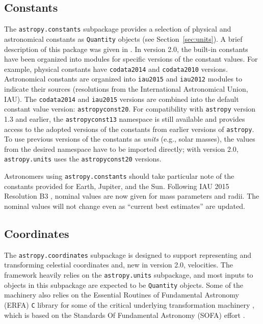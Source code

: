 \documentclass[modern]{aastex61}
\newcommand{\package}[1]{\texttt{#1}\xspace}
\newcommand{\astropypkg}{\package{astropy}}
\newcommand{\sectionname}{Section\xspace}
\begin{document}
\subsection{Constants}

The \texttt{astropy.constants} subpackage provides a selection of physical and
astronomical constants as \texttt{Quantity} objects (see
\sectionname~\ref{sec:units}).
A brief description of this package was given in \citep{astropy}.
In version 2.0, the built-in constants have been organized into modules for
specific versions of the constant values.
For example, physical constants have \texttt{codata2014} \citep{codata2014} and
\texttt{codata2010} versions.
Astronomical constants are organized into \texttt{iau2015} and \texttt{iau2012}
modules to indicate their sources (resolutions from the International
Astronomical Union, IAU).
The \texttt{codata2014} and \texttt{iau2015} versions are combined into the
default constant value version: \texttt{astropyconst20}.
For compatibility with \astropypkg version 1.3 and earlier, the \texttt{astropyconst13}
namespace is still available and provides access to the adopted versions of the
constants from earlier versions of \astropypkg.
To use previous versions of the constants as \emph{units} (e.g., solar masses),
the values from the desired namespace have to be imported directly; with version
2.0, \texttt{astropy.units} uses the \texttt{astropyconst20} versions.

Astronomers using \texttt{astropy.constants} should take particular note of the
constants provided for Earth, Jupiter, and the Sun.
Following IAU 2015 Resolution B3 \citep{iau2015b3}, nominal values are now given
for mass parameters and radii.
The nominal values will not change even as ``current best estimates'' are
updated.

\subsection{Coordinates}
\label{sec:coordinates}
The \package{astropy.coordinates} subpackage is designed to support representing
and transforming celestial coordinates and, new in version 2.0, velocities.
The framework heavily relies on the \package{astropy.units} subpackage, and most
inputs to objects in this subpackage are expected to be \texttt{Quantity}
objects.
Some of the machinery also relies on the Essential Routines of Fundamental
Astronomy (ERFA) \texttt{C} library for some of the critical underlying
transformation machinery \citep{erfa}, which is based on the Standards Of
Fundamental Astronomy (SOFA) effort \citep{sofa}.
\end{document}
